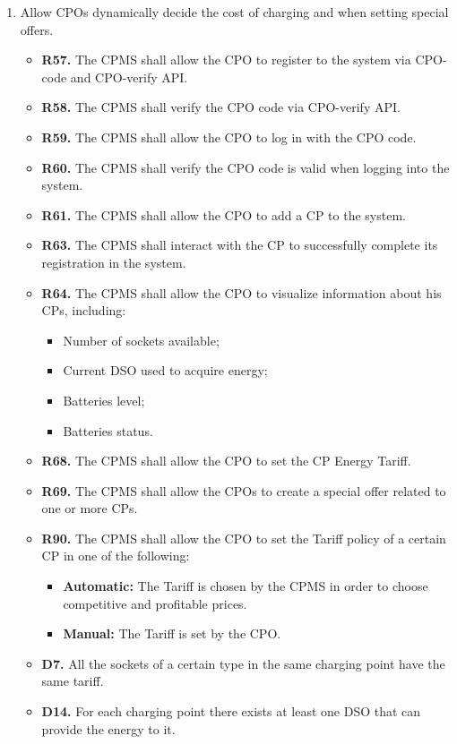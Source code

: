 \documentclass{Configuration_Files/PoliMi3i_thesis}
\begin{document}
\begin{enumerate}[label=\textbf{G\arabic*}]
    \item Allow CPOs dynamically decide the cost of charging and when setting special offers.
        \begin{itemize}
            \item \textbf{R57.} The CPMS shall allow the CPO to register to the system via CPO-code and CPO-verify API.
            \item \textbf{R58.} The CPMS shall verify the CPO code via CPO-verify API.
            \item \textbf{R59.} The CPMS shall allow the CPO to log in with the CPO code.
            \item \textbf{R60.} The CPMS shall verify the CPO code is valid when logging into the system.
            \item \textbf{R61.} The CPMS shall allow the CPO to add a CP to the system.
            \item \textbf{R63.} The CPMS shall interact with the CP to successfully complete its registration in the system.
            \item \textbf{R64.} The CPMS shall allow the CPO to visualize information about his CPs, including:
                \begin{itemize}
                    \item Number of sockets available;
                    \item Current DSO used to acquire energy;
                    \item Batteries level;
                    \item Batteries status.
                \end{itemize}
            \item \textbf{R68.} The CPMS shall allow the CPO to set the CP Energy Tariff.
            \item \textbf{R69.} The CPMS shall allow the CPOs to create a special offer related to one or more CPs.
            \item \textbf{R90.} The CPMS shall allow the CPO to set the Tariff policy of a certain CP in one of the following:
                \begin{itemize}
                    \item \textbf{Automatic:} The Tariff is chosen by the CPMS in order to choose competitive and profitable prices.   
                    \item\textbf{Manual:} The Tariff is set by the CPO. 
                \end{itemize}
            \item \textbf{D7.} All the sockets of a certain type in the same charging point have the same tariff.
            \item \textbf{D14.} For each charging point there exists at least one DSO that can provide the energy to it.
        \end{itemize}


\end{enumerate}
\end{document}

